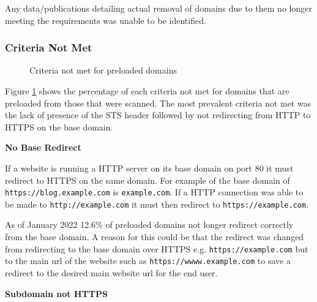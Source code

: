 \documentclass{mscreport}
\begin{document}
\vspace{0.3cm} \noindent
Any data/publications detailing actual removal of domains due to them no longer meeting the requirements was unable to be identified.

\subsubsection{Criteria Not Met}

\begin{figure}[t]
	\begin{center}
		\caption{Criteria not met for preloaded domains}
		\label{fig:STS_preloaded_criteria_not_met}
	\end{center}
\end{figure}


\vspace{0.3cm} \noindent
Figure \ref{fig:STS_preloaded_criteria_not_met} shows the percentage of each criteria not met for domains that are preloaded from those that were scanned. The most prevalent criteria not met  was the lack of presence of the STS header followed by not redirecting from HTTP to HTTPS on the base domain.

\vspace{0.5cm} \noindent
\textbf{No Base Redirect}

\vspace{0.3cm} \noindent
If a website is running a HTTP server on its base domain on port 80 it must redirect to HTTPS on the same domain. For example of the base domain of \texttt{https://blog.example.com} is \texttt{example.com}. If a HTTP connection was able to be made to \texttt{http://example.com} it must then redirect to \texttt{https://example.com}.

\vspace{0.3cm} \noindent
As of January 2022 12.6\% of preloaded domains not longer redirect correctly from the base domain. A reason for this could be that the redirect was changed from redirecting to the base domain over HTTPS e.g. \texttt{https://example.com} but to the main url of the website such as \texttt{https://wwww.example.com} to save a redirect to the desired main website url for the end user.

\vspace{0.5cm} \noindent
\textbf{Subdomain not HTTPS}
\end{document}
